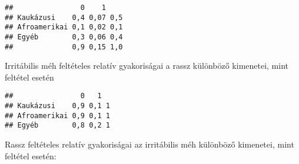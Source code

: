 \documentclass[]{book}
\newenvironment{Shaded}{\begin{snugshade}}{\end{snugshade}}
\newcommand{\KeywordTok}[1]{\textcolor[rgb]{0.13,0.29,0.53}{\textbf{#1}}}
\newcommand{\DecValTok}[1]{\textcolor[rgb]{0.00,0.00,0.81}{#1}}
\newcommand{\StringTok}[1]{\textcolor[rgb]{0.31,0.60,0.02}{#1}}
\newcommand{\OperatorTok}[1]{\textcolor[rgb]{0.81,0.36,0.00}{\textbf{#1}}}
\newcommand{\NormalTok}[1]{#1}
\begin{document}
\begin{Shaded}
\end{Shaded}

\begin{verbatim}
##                0    1    
## Kaukázusi    0,4 0,07 0,5
## Afroamerikai 0,1 0,02 0,1
## Egyéb        0,3 0,06 0,4
##              0,9 0,15 1,0
\end{verbatim}

Irritábilis méh feltételes relatív gyakoriságai a rassz különböző
kimenetei, mint feltétel esetén

\begin{Shaded}
\end{Shaded}

\begin{verbatim}
##                0   1  
## Kaukázusi    0,9 0,1 1
## Afroamerikai 0,9 0,1 1
## Egyéb        0,8 0,2 1
\end{verbatim}

Rassz feltételes relatív gyakoriságai az irritábilis méh különböző
kimenetei, mint feltétel esetén:

\begin{Shaded}
\end{Shaded}
\end{document}

